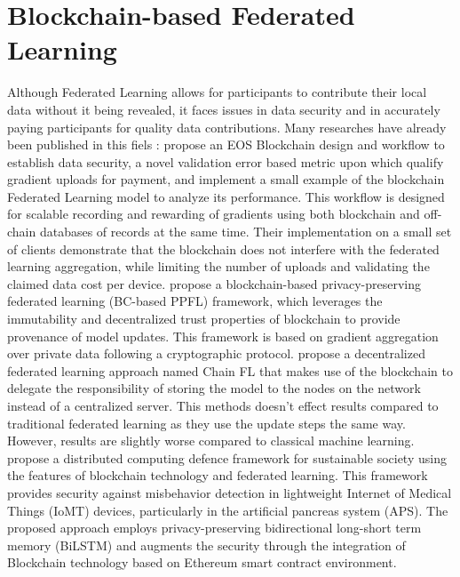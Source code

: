 \documentclass{article}
\begin{document}
\section{Blockchain-based Federated Learning}

Although Federated Learning allows for participants to contribute their local data without it being revealed, it faces issues in data security and in accurately paying participants for quality data contributions. Many researches have already been published in this fiels : 
\newline \newline \cite{martinez_record_2019} propose an EOS Blockchain design and workflow to establish data security, a novel validation error based metric upon which \cite{martinez_record_2019} qualify gradient uploads for payment, and implement a small example of the blockchain Federated Learning model to analyze its performance. This workflow is designed for scalable recording and rewarding of gradients using both blockchain and off-chain databases of records at the same time. Their implementation on a small set of clients demonstrate that the blockchain does not interfere with the federated learning aggregation, while limiting the number of uploads and validating the claimed data cost per device. 
\newline \newline \cite{awan_poster_2019} propose a blockchain-based privacy-preserving federated learning (BC-based PPFL) framework, which leverages the immutability and decentralized trust properties of blockchain to provide provenance of model updates. This framework is based on gradient aggregation over private data following a cryptographic protocol.
\newline \newline \cite{korkmaz_chainfl_2020} propose a decentralized federated learning approach named Chain FL that makes use of the blockchain to delegate the responsibility of storing the model to the nodes on the network instead of a centralized server. This methods doesn’t effect results compared to traditional federated learning as they use the update steps the same way. However, results are slightly worse compared to classical machine learning.
\newline \newline \cite{sharma_2020} propose a distributed computing defence framework for sustainable society using the features of blockchain technology and federated learning. This framework provides security against misbehavior detection in lightweight Internet of Medical Things (IoMT) devices, particularly in the artificial pancreas system (APS). The proposed approach employs privacy-preserving bidirectional long-short term memory (BiLSTM) and augments the security through the integration of Blockchain technology based on Ethereum smart contract environment.
\end{document}
